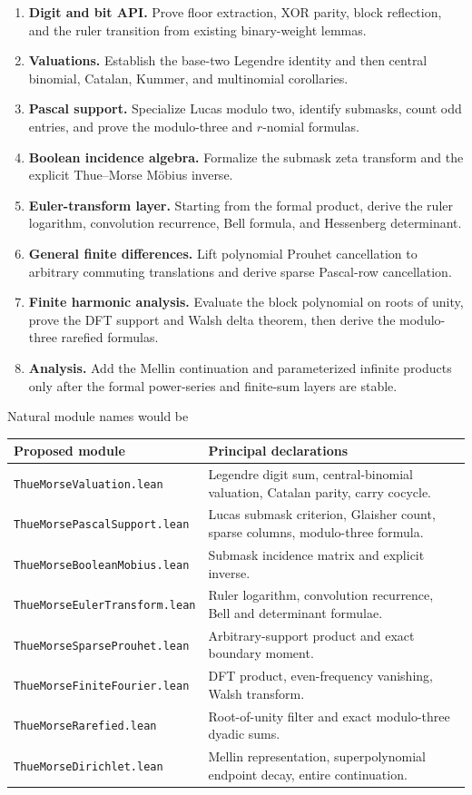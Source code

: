 \documentclass[11pt,oneside]{article}
\theoremstyle{definition}
\theoremstyle{remark}
\newcommand{\lean}[1]{%
  \ifmmode\text{\nolinkurl{#1}}\else\nolinkurl{#1}\fi}
\begin{document}
\begin{enumerate}
\item \textbf{Digit and bit API.}  Prove floor extraction, XOR parity, block reflection,
      and the ruler transition from existing binary-weight lemmas.
\item \textbf{Valuations.}  Establish the base-two Legendre identity and then central
      binomial, Catalan, Kummer, and multinomial corollaries.
\item \textbf{Pascal support.}  Specialize Lucas modulo two, identify submasks, count odd
      entries, and prove the modulo-three and \(r\)-nomial formulas.
\item \textbf{Boolean incidence algebra.}  Formalize the submask zeta transform and the
      explicit Thue--Morse M\"obius inverse.
\item \textbf{Euler-transform layer.}  Starting from the formal product, derive the ruler
      logarithm, convolution recurrence, Bell formula, and Hessenberg determinant.
\item \textbf{General finite differences.}  Lift polynomial Prouhet cancellation to
      arbitrary commuting translations and derive sparse Pascal-row cancellation.
\item \textbf{Finite harmonic analysis.}  Evaluate the block polynomial on roots of unity,
      prove the DFT support and Walsh delta theorem, then derive the modulo-three rarefied
      formulas.
\item \textbf{Analysis.}  Add the Mellin continuation and parameterized infinite products
      only after the formal power-series and finite-sum layers are stable.
\end{enumerate}

Natural module names would be
\begin{center}
\small
\begin{tabularx}{0.95\textwidth}{@{}lX@{}}
\toprule
Proposed module & Principal declarations \\
\midrule
\lean{ThueMorseValuation.lean} &
Legendre digit sum, central-binomial valuation, Catalan parity, carry cocycle.\\
\lean{ThueMorsePascalSupport.lean} &
Lucas submask criterion, Glaisher count, sparse columns, modulo-three formula.\\
\lean{ThueMorseBooleanMobius.lean} &
Submask incidence matrix and explicit inverse.\\
\lean{ThueMorseEulerTransform.lean} &
Ruler logarithm, convolution recurrence, Bell and determinant formulae.\\
\lean{ThueMorseSparseProuhet.lean} &
Arbitrary-support product and exact boundary moment.\\
\lean{ThueMorseFiniteFourier.lean} &
DFT product, even-frequency vanishing, Walsh transform.\\
\lean{ThueMorseRarefied.lean} &
Root-of-unity filter and exact modulo-three dyadic sums.\\
\lean{ThueMorseDirichlet.lean} &
Mellin representation, superpolynomial endpoint decay, entire continuation.\\
\bottomrule
\end{tabularx}
\end{center}
\end{document}
